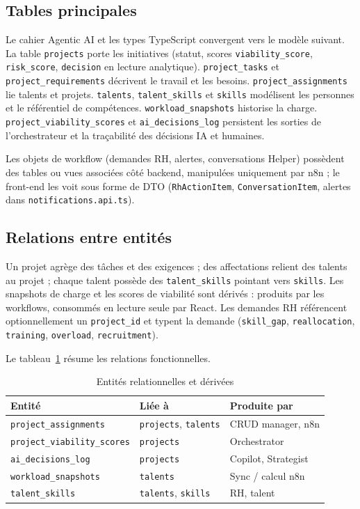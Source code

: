 \subsection{Tables principales}

Le cahier Agentic AI et les types TypeScript convergent vers le modèle suivant. La table \texttt{projects} porte les initiatives (statut, scores \texttt{viability\_score}, \texttt{risk\_score}, \texttt{decision} en lecture analytique). \texttt{project\_tasks} et \texttt{project\_requirements} décrivent le travail et les besoins. \texttt{project\_assignments} lie talents et projets. \texttt{talents}, \texttt{talent\_skills} et \texttt{skills} modélisent les personnes et le référentiel de compétences. \texttt{workload\_snapshots} historise la charge. \texttt{project\_viability\_scores} et \texttt{ai\_decisions\_log} persistent les sorties de l'orchestrateur et la traçabilité des décisions IA et humaines.

Les objets de workflow (demandes RH, alertes, conversations Helper) possèdent des tables ou vues associées côté backend, manipulées uniquement par n8n ; le front-end les voit sous forme de DTO (\texttt{RhActionItem}, \texttt{ConversationItem}, alertes dans \texttt{notifications.api.ts}).

\subsection{Relations entre entités}

Un projet agrège des tâches et des exigences ; des affectations relient des talents au projet ; chaque talent possède des \texttt{talent\_skills} pointant vers \texttt{skills}. Les snapshots de charge et les scores de viabilité sont dérivés : produits par les workflows, consommés en lecture seule par React. Les demandes RH référencent optionnellement un \texttt{project\_id} et typent la demande (\texttt{skill\_gap}, \texttt{reallocation}, \texttt{training}, \texttt{overload}, \texttt{recruitment}).

Le tableau~\ref{tab:entites-ch4} résume les relations fonctionnelles.

\begin{table}[htbp]
\centering
\caption{Entités relationnelles et dérivées}
\label{tab:entites-ch4}
\begin{tabular}{@{}lll@{}}
\toprule
\textbf{Entité} & \textbf{Liée à} & \textbf{Produite par} \\
\midrule
\texttt{project\_assignments} & \texttt{projects}, \texttt{talents} & CRUD manager, n8n \\
\texttt{project\_viability\_scores} & \texttt{projects} & Orchestrator \\
\texttt{ai\_decisions\_log} & \texttt{projects} & Copilot, Strategist \\
\texttt{workload\_snapshots} & \texttt{talents} & Sync / calcul n8n \\
\texttt{talent\_skills} & \texttt{talents}, \texttt{skills} & RH, talent \\
\bottomrule
\end{tabular}
\end{table}

